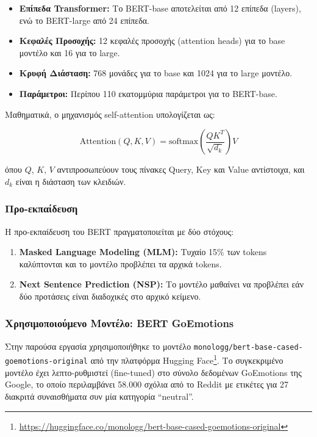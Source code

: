 \documentclass[a4paper,11pt,oneside,openany]{ioniothesis}
\begin{document}
\begin{itemize}
    \item \textbf{Επίπεδα Transformer:} Το BERT-base αποτελείται από 12 επίπεδα (layers), ενώ το BERT-large από 24 επίπεδα.
    \item \textbf{Κεφαλές Προσοχής:} 12 κεφαλές προσοχής (attention heads) για το base μοντέλο και 16 για το large.
    \item \textbf{Κρυφή Διάσταση:} 768 μονάδες για το base και 1024 για το large μοντέλο.
    \item \textbf{Παράμετροι:} Περίπου 110 εκατομμύρια παράμετροι για το BERT-base.
\end{itemize}

Μαθηματικά, ο μηχανισμός self-attention υπολογίζεται ως:

\begin{equation}
\text{Attention}(Q, K, V) = \text{softmax}\left(\frac{QK^T}{\sqrt{d_k}}\right)V
\label{eq:attention}
\end{equation}

\noindent όπου $Q$, $K$, $V$ αντιπροσωπεύουν τους πίνακες Query, Key και Value αντίστοιχα, και $d_k$ είναι η διάσταση των κλειδιών.

\subsubsection{Προ-εκπαίδευση}
\label{sec:Προ-εκπαίδευση BERT}

Η προ-εκπαίδευση του BERT πραγματοποιείται με δύο στόχους:

\begin{enumerate}
    \item \textbf{Masked Language Modeling (MLM):} Τυχαίο 15\% των tokens καλύπτονται και το μοντέλο προβλέπει τα αρχικά tokens.
    \item \textbf{Next Sentence Prediction (NSP):} Το μοντέλο μαθαίνει να προβλέπει εάν δύο προτάσεις είναι διαδοχικές στο αρχικό κείμενο.
\end{enumerate}

\subsubsection{Χρησιμοποιούμενο Μοντέλο: BERT GoEmotions}
\label{sec:Χρησιμοποιούμενο Μοντέλο BERT GoEmotions}

Στην παρούσα εργασία χρησιμοποιήθηκε το μοντέλο \texttt{monologg/bert-base-cased-goemotions-original} από την πλατφόρμα Hugging Face\footnote{\url{https://huggingface.co/monologg/bert-base-cased-goemotions-original}}. Το συγκεκριμένο μοντέλο έχει λεπτο-ρυθμιστεί (fine-tuned) στο σύνολο δεδομένων GoEmotions της Google, το οποίο περιλαμβάνει 58.000 σχόλια από το Reddit με ετικέτες για 27 διακριτά συναισθήματα συν μία κατηγορία ``neutral''.
\end{document}
